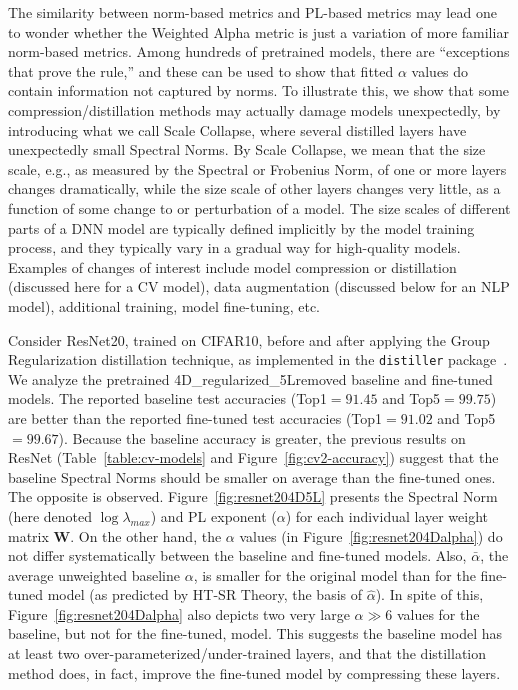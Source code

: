 The similarity between norm-based metrics and PL-based metrics may lead one to wonder whether the Weighted Alpha metric is just a variation of more familiar norm-based metrics.  
Among hundreds of pretrained models, there are ``exceptions that prove the rule,'' and these can be used to show that fitted $\alpha$ values do contain information not captured by norms. 
To illustrate this, we show that some compression/distillation methods \cite{CWZZ17_TR} may actually damage models unexpectedly, by introducing what we call Scale Collapse, where several distilled layers have unexpectedly small Spectral Norms.
%
By Scale Collapse, we mean that the size scale, e.g., as measured by the Spectral or Frobenius Norm, of one or more layers changes dramatically, while the size scale of other layers changes very little, as a function of some change to or perturbation of a model.
The size scales of different parts of a DNN model are typically defined implicitly by the model training process, and they typically vary in a gradual way for high-quality models.
Examples of changes of interest include model compression or distillation (discussed here for a CV model), data augmentation (discussed below for an NLP model), additional training, model fine-tuning, etc.

Consider ResNet20, trained on CIFAR10, before and after applying the Group Regularization distillation technique, as implemented in the \texttt{distiller} package~\cite{distiller}.
We analyze the pretrained 4D\_regularized\_5Lremoved baseline and fine-tuned models. 
The reported baseline test accuracies (Top1$=91.45$ and Top5$=99.75$) are better than the reported fine-tuned test accuracies (Top1$=91.02$ and Top5$=99.67$).  
Because the baseline accuracy is greater,  the previous results on ResNet (Table~\ref{table:cv-models} and Figure~\ref{fig:cv2-accuracy}) suggest that the baseline Spectral Norms should be smaller on average than the fine-tuned ones.
The opposite is observed.
Figure~\ref{fig:resnet204D5L} presents the Spectral Norm (here denoted $\log\lambda_{max}$) and PL exponent ($\alpha$) for each individual layer weight matrix $\mathbf{W}$.
On the other hand, the $\alpha$ values (in Figure~\ref{fig:resnet204Dalpha}) do not differ systematically between the baseline and fine-tuned models.
Also, $\bar{\alpha}$, the average unweighted baseline $\alpha$, is smaller for the original model than for the fine-tuned model 
(as predicted by HT-SR Theory, the basis of $\hat{\alpha}$).
%
In spite of this, Figure~\ref{fig:resnet204Dalpha} also depicts two very large $\alpha\gg 6$ values for the baseline, but not for the fine-tuned, model.
This suggests the baseline model has at least two over-parameterized/under-trained layers, and that the distillation method does, in fact, improve the fine-tuned model by compressing these layers.

